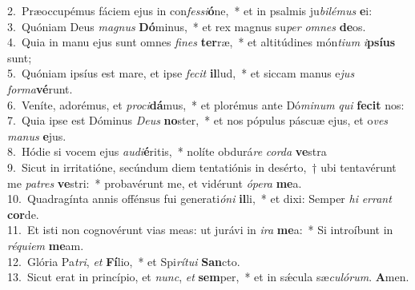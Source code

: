 {2.~}Præoccupémus fáciem ejus in con\textit{fes}\textit{si}\textbf{ó}ne,~* et in psalmis ju\textit{bi}\textit{lé}\textit{mus} \textbf{e}i:\\
{3.~}Quóniam Deus \textit{ma}\textit{gnus} \textbf{Dó}minus,~* et rex magnus su\textit{per} \textit{om}\textit{nes} \textbf{de}os.\\
{4.~}Quia in manu ejus sunt omnes \textit{fi}\textit{nes} \textbf{ter}ræ,~* et altitúdines món\textit{ti}\textit{um} \textit{i}\textbf{psí}\textbf{us} sunt;\\
{5.~}Quóniam ipsíus est mare, et ipse \textit{fe}\textit{cit} \textbf{il}lud,~* et siccam manus e\textit{jus} \textit{for}\textit{ma}\textbf{vé}runt.\\
{6.~}Veníte, adorémus, et \textit{pro}\textit{ci}\textbf{dá}mus,~* et plorémus ante Dó\textit{mi}\textit{num} \textit{qui} \textbf{fe}\textbf{cit} nos:\\
{7.~}Quia ipse est Dóminus \textit{De}\textit{us} \textbf{no}ster,~* et nos pópulus páscuæ ejus, et o\textit{ves} \textit{ma}\textit{nus} \textbf{e}jus.\\
{8.~}Hódie si vocem ejus \textit{au}\textit{di}\textbf{é}ritis,~* nolíte obdurá\textit{re} \textit{cor}\textit{da} \textbf{ve}stra\\
{9.~}Sicut in irritatióne, secúndum diem tentatiónis in desérto,~† ubi tentavérunt me \textit{pa}\textit{tres} \textbf{ve}stri:~* probavérunt me, et vidérunt \textit{ó}\textit{pe}\textit{ra} \textbf{me}a.\\
{10.~}Quadragínta annis offénsus fui generati\textit{ó}\textit{ni} \textbf{il}li,~* et dixi: Semper \textit{hi} \textit{er}\textit{rant} \textbf{cor}de.\\
{11.~}Et isti non cognovérunt vias meas: ut jurávi in \textit{i}\textit{ra} \textbf{me}a:~* Si introíbunt in \textit{ré}\textit{qui}\textit{em} \textbf{me}am.\\
{12.~}Glória Pa\textit{tri}, \textit{et} \textbf{Fí}lio,~* et Spi\textit{rí}\textit{tu}\textit{i} \textbf{San}cto.\\
{13.~}Sicut erat in princípio, et \textit{nunc}, \textit{et} \textbf{sem}per,~* et in sǽcula sæ\textit{cu}\textit{ló}\textit{rum}. \textbf{A}men.\\
